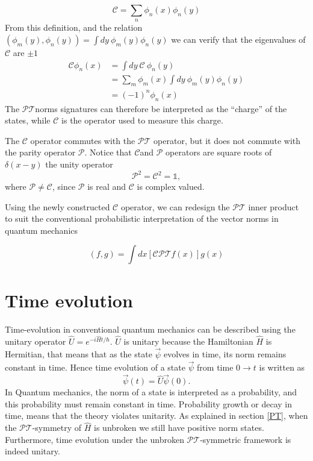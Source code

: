 \documentclass[12pt, a4paper]{report}
\newcommand\PT{\(\mathcal{PT}\)}
\newcommand\PP{\(\mathcal{P}\)}
\newcommand\CC{\(\mathcal{C}\)}
\begin{document}
\begin{equation}\label{eq:7}
\mathcal{C} = \sum_n \phi_n(x)\phi_n(y)
\end{equation}
From this definition, and the relation $(\phi_m(y), \phi_n(y)) = \int dy\:\phi_m(y)\phi_n(y)$ we can verify that the eigenvalues of \CC\: are $\pm 1$
\begin{align}\label{eq:7}
\mathcal{C} \phi_n(x) & = \int dy\:\mathcal{C}\:\phi_n(y)\nonumber \\
& = \sum_{m}\phi_m(x)\int dy\:\phi_m(y) \phi_n(y)\nonumber \\
& = (-1)^n \phi_n(x)
\end{align}
The \PT\:norms signatures can therefore be interpreted as the ``charge'' of the states, while \CC\: is the operator used to measure this charge\cite{Bender_2004}.

The \CC\: operator commutes with the \PT\: operator, but it does not commute with the parity operator \PP. Notice that \CC\:and \PP\: operators are square roots of $\delta(x-y)$ the unity operator\cite{ComplexExtension}
\begin{equation}\label{eq:8}
\mathcal{P}^2 = \mathcal{C}^2 = \mathds{1}, 
\end{equation}
where $\mathcal{P} \neq \mathcal{C}$, since \PP\: is real and \CC\: is complex valued\cite{MustaHbeHermitian}\cite{Bender_2004}.

Using the newly constructed \CC\: operator, we can redesign the \PT\: inner product to suit the conventional probabilistic interpretation of the vector norms in quantum mechanics

\begin{equation}\label{eq:9}
\left( f, g \right ) = \int dx \left [ \mathcal{CPT} f(x) \right ] g(x)
\end{equation}

\chapter{Time evolution}\label{TEv}
Time-evolution in conventional quantum mechanics can be described using the unitary operator $\hat{U} = e^{-i\hat{H}t/\hbar}$.
$\hat{U}$ is unitary because the Hamiltonian $\hat{H}$ is Hermitian, that means that as the state $\vec{\psi}$ evolves in time, its norm remains constant in time. Hence time evolution of a state $\vec{\psi}$ from time $0 \rightarrow t$ is written as
\begin{equation}\label{eq:10}
\vec{\psi}(t) = \hat{U} \vec{\psi}(0).
\end{equation}
In Quantum mechanics, the norm of a state is interpreted as a probability, and this probability must remain constant in time. Probability growth or decay in time, means that the theory violates unitarity. As explained in section \ref{PT}, when the \PT-symmetry of $\hat{H}$ is unbroken we still have positive norm states. Furthermore, time evolution under the unbroken \PT-symmetric framework is indeed unitary\cite{Jones-Smith}\cite{ComplexExtension}\cite{Mostafazadeh2}.
\end{document}
